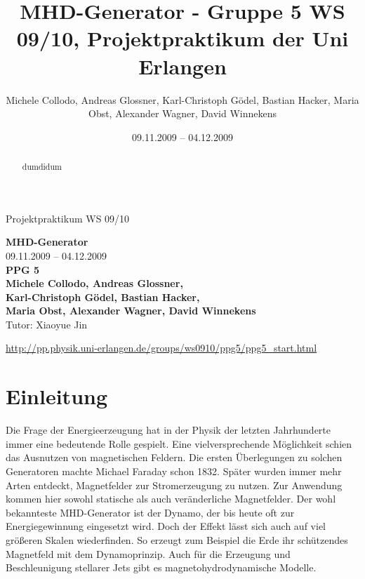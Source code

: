 \documentclass[11pt]{scrartcl}
\title{MHD-Generator - Gruppe 5 WS 09/10, Projektpraktikum der Uni Erlangen}
\date{09.11.2009 -- 04.12.2009}
\author{Michele Collodo, Andreas Glossner, Karl-Christoph G\"odel, Bastian Hacker, Maria Obst, Alexander Wagner, David Winnekens}
\begin{document}
\sloppy %
\thispagestyle{empty}
\large{Projektpraktikum WS 09/10}
\hfill
{}
\\[8\baselineskip]
\begin{center}
{\Huge\textbf{MHD-Generator}}
\\[2\baselineskip]
{\Large 09.11.2009 -- 04.12.2009}
\\[6\baselineskip]
{\huge\textbf{PPG 5}}\\[0.5\baselineskip]
{\large\textbf{
Michele Collodo,
Andreas Glossner,\\
Karl-Christoph G\"odel,
Bastian Hacker,\\
Maria Obst,
Alexander Wagner,
David Winnekens}\\
Tutor: Xiaoyue Jin}
\vfill



\small{\url{http://pp.physik.uni-erlangen.de/groups/ws0910/ppg5/ppg5\_start.html}}
\end{center}
\newpage



\tableofcontents
\vfill



\begin{abstract}
dumdidum
\end{abstract}
\newpage


\section{Einleitung}	%
Die Frage der Energieerzeugung hat in der Physik der letzten Jahrhunderte immer eine bedeutende Rolle gespielt. Eine vielversprechende M\"oglichkeit schien das Ausnutzen von magnetischen Feldern. Die ersten \"Uberlegungen zu solchen Generatoren machte Michael Faraday schon 1832. Sp\"ater wurden immer mehr Arten entdeckt, Magnetfelder zur Stromerzeugung zu nutzen. Zur Anwendung kommen hier sowohl statische als auch ver\"anderliche Magnetfelder. Der wohl bekannteste MHD-Generator ist der Dynamo, der bis heute oft zur Energiegewinnung eingesetzt wird. Doch der Effekt l\"asst sich auch auf viel gr\"o\ss{}eren Skalen wiederfinden. So erzeugt zum Beispiel die Erde ihr sch\"utzendes Magnetfeld mit dem Dynamoprinzip. Auch f\"ur die Erzeugung und Beschleunigung stellarer Jets gibt es magnetohydrodynamische Modelle.
\end{document}
